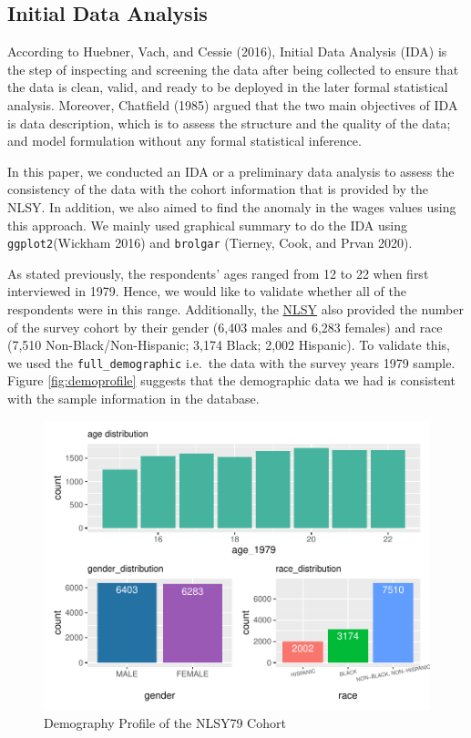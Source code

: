 \documentclass{article}
\begin{document}
\hypertarget{initial-data-analysis}{%
\subsection{Initial Data Analysis}\label{initial-data-analysis}}

According to Huebner, Vach, and Cessie (2016), Initial Data Analysis
(IDA) is the step of inspecting and screening the data after being
collected to ensure that the data is clean, valid, and ready to be
deployed in the later formal statistical analysis. Moreover, Chatfield
(1985) argued that the two main objectives of IDA is data description,
which is to assess the structure and the quality of the data; and model
formulation without any formal statistical inference.

In this paper, we conducted an IDA or a preliminary data analysis to
assess the consistency of the data with the cohort information that is
provided by the NLSY. In addition, we also aimed to find the anomaly in
the wages values using this approach. We mainly used graphical summary
to do the IDA using \texttt{ggplot2}(Wickham 2016) and \texttt{brolgar}
(Tierney, Cook, and Prvan 2020).

As stated previously, the respondents' ages ranged from 12 to 22 when
first interviewed in 1979. Hence, we would like to validate whether all
of the respondents were in this range. Additionally, the
\href{https://www.nlsinfo.org/content/cohorts/nlsy79/intro-to-the-sample/nlsy79-sample-introduction}{NLSY}
also provided the number of the survey cohort by their gender (6,403
males and 6,283 females) and race (7,510 Non-Black/Non-Hispanic; 3,174
Black; 2,002 Hispanic). To validate this, we used the
\texttt{full\_demographic} i.e.~the data with the survey years 1979
sample. Figure \ref{fig:demoprofile} suggests that the demographic data
we had is consistent with the sample information in the database.

\begin{figure}
\centering
\includegraphics{report_files/figure-latex/demoprofile-1.pdf}
\caption{Demography Profile of the NLSY79 Cohort}
\end{figure}
\end{document}
